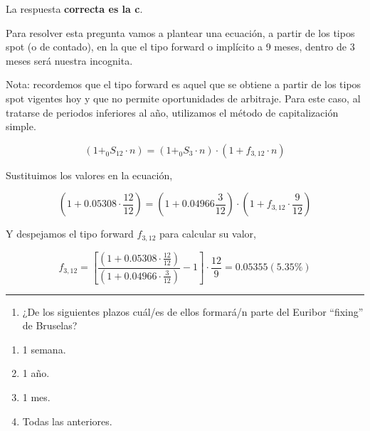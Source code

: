 \documentclass[
  letterpaper,
  DIV=11,
  numbers=noendperiod]{scrreprt}
\providecommand{\tightlist}{%
  \setlength{\itemsep}{0pt}\setlength{\parskip}{0pt}}\usepackage{longtable,booktabs,array}
\begin{document}
\begin{tcolorbox}[enhanced jigsaw, left=2mm, opacityback=0, colback=white, breakable, arc=.35mm, bottomrule=.15mm, rightrule=.15mm, toprule=.15mm, leftrule=.75mm, colframe=quarto-callout-tip-color-frame]
\begin{minipage}[t]{5.5mm}
\textcolor{quarto-callout-tip-color}{\faLightbulb}
\end{minipage}%
\begin{minipage}[t]{\textwidth - 5.5mm}

La respuesta \textbf{correcta es la c}.

Para resolver esta pregunta vamos a plantear una ecuación, a partir de
los tipos spot (o de contado), en la que el tipo forward o implícito a 9
meses, dentro de 3 meses será nuestra incognita.

Nota: recordemos que el tipo forward es aquel que se obtiene a partir de
los tipos spot vigentes hoy y que no permite oportunidades de arbitraje.
Para este caso, al tratarse de periodos inferiores al año, utilizamos el
método de capitalización simple.

\[(1+_{0}S_{12} \cdot {n})=(1+_{0}S_{3} \cdot n)\cdot(1+f_{3,12}\cdot {n})\]

Sustituimos los valores en la ecuación,

\[(1+0.05308\cdot \frac{12}{12})=(1+0.04966\frac{3}{12})\cdot(1+f_{3,12}\cdot \frac{9}{12})\]

Y despejamos el tipo forward \(f_{3,12}\) para calcular su valor,

\[f_{3,12}=\left[\frac{(1+0.05308\cdot \frac{12}{12})}{(1+0.04966\cdot \frac{3}{12})}-1\right]\cdot\frac{12}{9}=0.05355(5.35\%)\]

\end{minipage}%
\end{tcolorbox}

\begin{center}\rule{0.5\linewidth}{0.5pt}\end{center}

\begin{enumerate}
\def\labelenumi{\arabic{enumi}.}
\setcounter{enumi}{43}
\tightlist
\item
  ¿De los siguientes plazos cuál/es de ellos formará/n parte del Euribor
  ``fixing'' de Bruselas?
\end{enumerate}

\begin{enumerate}
\def\labelenumi{\alph{enumi}.}
\item
  1 semana.
\item
  1 año.
\item
  1 mes.
\item
  Todas las anteriores.
\end{enumerate}
\end{document}
